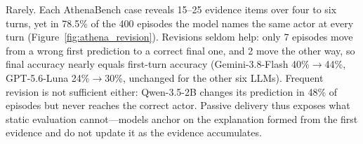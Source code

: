 Rarely. Each AthenaBench case reveals 15--25 evidence items over four to six turns, yet in 78.5\% of the 400 episodes the model names the same actor at every turn (Figure~\ref{fig:athena_revision}). Revisions seldom help: only 7 episodes move from a wrong first prediction to a correct final one, and 2 move the other way, so final accuracy nearly equals first-turn accuracy (Gemini-3.8-Flash 40\%$\to$44\%, GPT-5.6-Luna 24\%$\to$30\%, unchanged for the other six LLMs). Frequent revision is not sufficient either: Qwen-3.5-2B changes its prediction in 48\% of episodes but never reaches the correct actor. Passive delivery thus exposes what static evaluation cannot---models anchor on the explanation formed from the first evidence and do not update it as the evidence accumulates.

%
